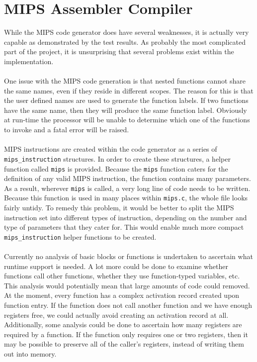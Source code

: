 \section{MIPS Assembler Compiler}
While the MIPS code generator does have several weaknesses, it is actually very capable as demonstrated by the test results. As probably the most complicated part of the project, it is unsurprising that several problems exist within the implementation.
\ \\ \ \\
One issue with the MIPS code generation is that nested functions cannot share the same names, even if they reside in different scopes. The reason for this is that the user defined names are used to generate the function labels. If two functions have the same name, then they will produce the same function label. Obviously at run-time the processor will be unable to determine which one of the functions to invoke and a fatal error will be raised.
\ \\ \ \\
MIPS instructions are created within the code generator as a series of \verb!mips_instruction! structures. In order to create these structures, a helper function called \verb!mips! is provided. Because the \verb!mips! function caters for the definition of any valid MIPS instruction, the function contains many parameters. As a result, wherever \verb!mips! is called, a very long line of code needs to be written. Because this function is used in many places within \verb!mips.c!, the whole file looks fairly untidy. To remedy this problem, it would be better to split the MIPS instruction set into different types of instruction, depending on the number and type of parameters that they cater for. This would enable much more compact \verb!mips_instruction! helper functions to be created.
\ \\ \ \\
Currently no analysis of basic blocks or functions is undertaken to ascertain what runtime support is needed. A lot more could be done to examine whether functions call other functions, whether they use function-typed variables, etc. This analysis would potentially mean that large amounts of code could removed. At the moment, every function has a complex activation record created upon function entry. If the function does not call another function and we have enough registers free, we could actually avoid creating an activation record at all. Additionally, some analysis could be done to ascertain how many registers are required by a function. If the function only requires one or two registers, then it may be possible to preserve all of the caller's registers, instead of writing them out into memory.
